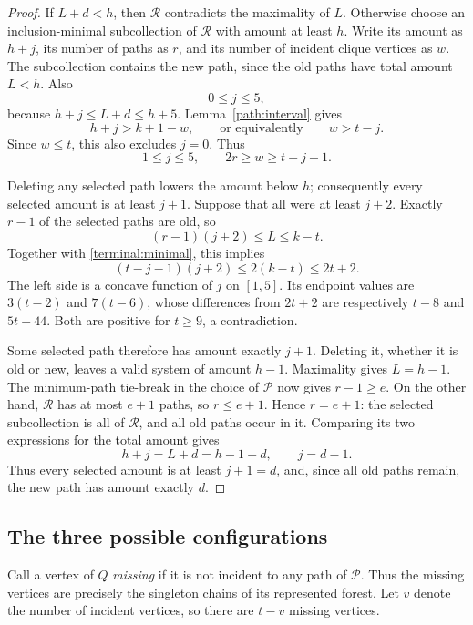 \begin{proof}
If \(L+d<h\), then \(\mathcal R\) contradicts the maximality of \(L\).
Otherwise choose an inclusion-minimal subcollection of \(\mathcal R\) with
amount at least \(h\).  Write its amount as \(h+j\), its number of paths as
\(r\), and its number of incident clique vertices as \(w\).
The subcollection contains the new path, since the old paths have total
amount \(L<h\).  Also
\[
 0\le j\le5,
\]
because \(h+j\le L+d\le h+5\).
Lemma~\ref{path:interval} gives
\[
 h+j>k+1-w,\qquad\text{or equivalently}\qquad w>t-j.
\]
Since \(w\le t\), this also excludes \(j=0\).  Thus
\begin{equation}\label{terminal:minimal}
 1\le j\le5,\qquad 2r\ge w\ge t-j+1.
\end{equation}

Deleting any selected path lowers the amount below \(h\); consequently
every selected amount is at least \(j+1\).
Suppose that all were at least \(j+2\).
Exactly \(r-1\) of the selected paths are old, so
\[
 (r-1)(j+2)\le L\le k-t.
\]
Together with \eqref{terminal:minimal}, this implies
\[
 (t-j-1)(j+2)\le2(k-t)\le2t+2.
\]
The left side is a concave function of \(j\) on \([1,5]\).
Its endpoint values are \(3(t-2)\) and \(7(t-6)\), whose differences from
\(2t+2\) are respectively \(t-8\) and \(5t-44\).
Both are positive for \(t\ge9\), a contradiction.

Some selected path therefore has amount exactly \(j+1\).
Deleting it, whether it is old or new, leaves a valid system of amount
\(h-1\).  Maximality gives \(L=h-1\).
The minimum-path tie-break in the choice of \(\mathcal P\) now gives
\(r-1\ge e\).
On the other hand, \(\mathcal R\) has at most \(e+1\) paths, so \(r\le e+1\).
Hence \(r=e+1\): the selected subcollection is all of \(\mathcal R\), and
all old paths occur in it.
Comparing its two expressions for the total amount gives
\[
 h+j=L+d=h-1+d,\qquad j=d-1.
\]
Thus every selected amount is at least \(j+1=d\), and, since all old paths
remain, the new path has amount exactly \(d\).
\end{proof}

\subsection{The three possible configurations}

Call a vertex of \(Q\) \emph{missing} if it is not incident to any path of
\(\mathcal P\).  Thus the missing vertices are precisely the singleton
chains of its represented forest.  Let \(v\) denote the number of incident
vertices, so there are \(t-v\) missing vertices.

